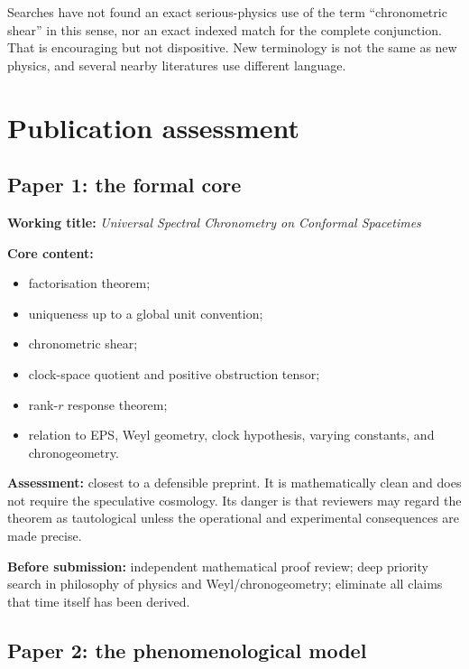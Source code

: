 \documentclass[
  10pt,
]{article}
\providecommand{\tightlist}{%
  \setlength{\itemsep}{0pt}\setlength{\parskip}{0pt}}
\begin{document}
Searches have not found an exact serious-physics use of the term
``chronometric shear'' in this sense, nor an exact indexed match for the
complete conjunction. That is encouraging but not dispositive. New
terminology is not the same as new physics, and several nearby
literatures use different language.

\section{Publication assessment}\label{publication-assessment}

\subsection{Paper 1: the formal core}\label{paper-1-the-formal-core}

\textbf{Working title:} \emph{Universal Spectral Chronometry on
Conformal Spacetimes}

\textbf{Core content:}

\begin{itemize}
\tightlist
\item
  factorisation theorem;
\item
  uniqueness up to a global unit convention;
\item
  chronometric shear;
\item
  clock-space quotient and positive obstruction tensor;
\item
  rank-\(r\) response theorem;
\item
  relation to EPS, Weyl geometry, clock hypothesis, varying constants,
  and chronogeometry.
\end{itemize}

\textbf{Assessment:} closest to a defensible preprint. It is
mathematically clean and does not require the speculative cosmology. Its
danger is that reviewers may regard the theorem as tautological unless
the operational and experimental consequences are made precise.

\textbf{Before submission:} independent mathematical proof review; deep
priority search in philosophy of physics and Weyl/chronogeometry;
eliminate all claims that time itself has been derived.

\subsection{Paper 2: the phenomenological
model}\label{paper-2-the-phenomenological-model}
\end{document}
